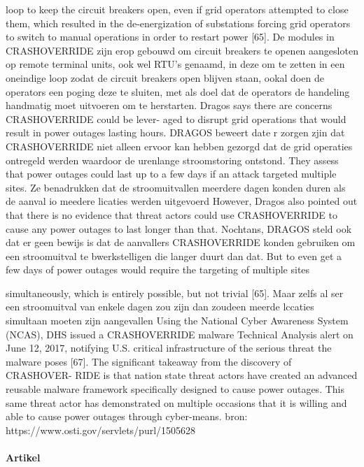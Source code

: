 {loop to keep the circuit breakers open, even if grid operators attempted
to close them, which resulted in the de-energization of substations forcing
grid operators to switch to manual operations in order to restart power
[65]. De modules in CRASHOVERRIDE zijn erop gebouwd om circuit breakers te openen
aangesloten op remote terminal units, ook wel RTU’s genaamd, in deze om te zetten in een
oneindige loop zodat de circuit breakers open blijven staan, ookal doen de operators een
poging deze te sluiten, met als doel dat de operators de handeling handmatig moet uitvoeren
om te herstarten.
Dragos says there are concerns CRASHOVERRIDE could be lever-
aged to disrupt grid operations that would result in power outages lasting
hours. DRAGOS beweert date r zorgen zjin dat CRASHOVERRIDE niet alleen ervoor kan
hebben gezorgd dat de grid operaties ontregeld werden waardoor de urenlange
stroomstoring ontstond.
They assess that power outages could last up to a few days if an attack targeted multiple
sites. Ze benadrukken dat de stroomuitvallen meerdere dagen konden duren als de aanval io
meedere licaties werden uitgevoerd
However, Dragos also pointed out that there is no evidence that threat actors could use
CRASHOVERRIDE to cause any power outages to last longer than that. Nochtans,
DRAGOS steld ook dat er geen bewijs is dat de aanvallers CRASHOVERRIDE konden
gebruiken om een stroomuitval te bwerkstelligen die langer duurt dan dat.
But to even get a few days of power outages would require the targeting of multiple sites

simultaneously, which is entirely possible, but not trivial [65]. Maar zelfs al ser een
stroomuitval van enkele dagen zou zijn dan zoudeen meerde lccaties simultaan moeten zijn
aangevallen
Using the National Cyber Awareness System (NCAS), DHS issued a
CRASHOVERRIDE malware Technical Analysis alert on June 12, 2017, notifying U.S. critical
infrastructure of the serious threat the malware poses [67].
The significant takeaway from the discovery of CRASHOVER-
RIDE is that nation state threat actors have created an advanced reusable
malware framework specifically designed to cause power outages.
This same threat actor has demonstrated on multiple occasions that it is willing and able to
cause power outages through cyber-means.
bron:
https://www.osti.gov/servlets/purl/1505628


\paragraph{Artikel}

}
